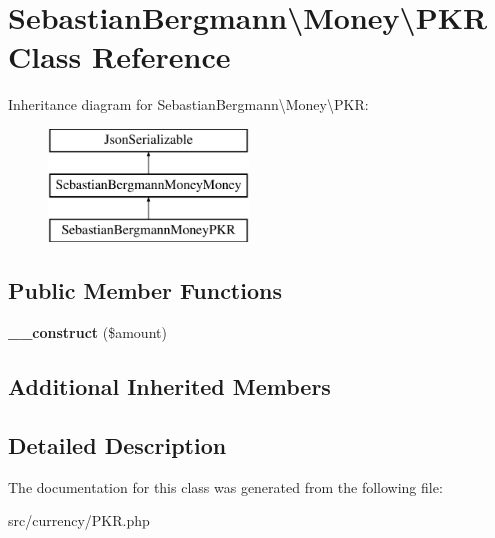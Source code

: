 \hypertarget{classSebastianBergmann_1_1Money_1_1PKR}{}\section{Sebastian\+Bergmann\textbackslash{}Money\textbackslash{}P\+K\+R Class Reference}
\label{classSebastianBergmann_1_1Money_1_1PKR}
Inheritance diagram for Sebastian\+Bergmann\textbackslash{}Money\textbackslash{}P\+K\+R\+:\begin{figure}[H]
\begin{center}
\leavevmode
\includegraphics[height=3.000000cm]{classSebastianBergmann_1_1Money_1_1PKR}
\end{center}
\end{figure}
\subsection*{Public Member Functions}
\begin{DoxyCompactItemize}
\item 
\hypertarget{classSebastianBergmann_1_1Money_1_1PKR_a5cb11c9eac71f506dca6edb7b58e9e4d}{}{\bfseries \+\_\+\+\_\+construct} (\$amount)\label{classSebastianBergmann_1_1Money_1_1PKR_a5cb11c9eac71f506dca6edb7b58e9e4d}

\end{DoxyCompactItemize}
\subsection*{Additional Inherited Members}


\subsection{Detailed Description}


The documentation for this class was generated from the following file\+:\begin{DoxyCompactItemize}
\item 
src/currency/P\+K\+R.\+php\end{DoxyCompactItemize}
